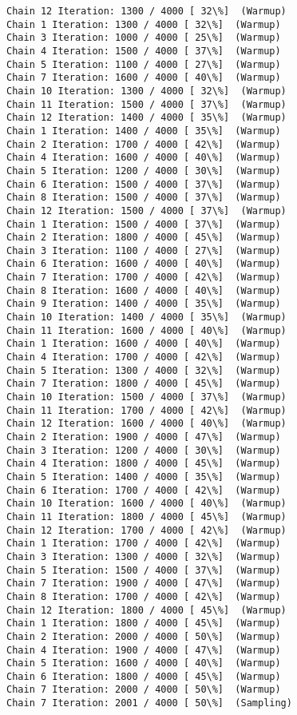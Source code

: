 \documentclass[11pt]{article}
\begin{document}
\begin{Verbatim}[commandchars=\\\{\}]
Chain 12 Iteration: 1300 / 4000 [ 32\%]  (Warmup)
Chain 1 Iteration: 1300 / 4000 [ 32\%]  (Warmup)
Chain 3 Iteration: 1000 / 4000 [ 25\%]  (Warmup)
Chain 4 Iteration: 1500 / 4000 [ 37\%]  (Warmup)
Chain 5 Iteration: 1100 / 4000 [ 27\%]  (Warmup)
Chain 7 Iteration: 1600 / 4000 [ 40\%]  (Warmup)
Chain 10 Iteration: 1300 / 4000 [ 32\%]  (Warmup)
Chain 11 Iteration: 1500 / 4000 [ 37\%]  (Warmup)
Chain 12 Iteration: 1400 / 4000 [ 35\%]  (Warmup)
Chain 1 Iteration: 1400 / 4000 [ 35\%]  (Warmup)
Chain 2 Iteration: 1700 / 4000 [ 42\%]  (Warmup)
Chain 4 Iteration: 1600 / 4000 [ 40\%]  (Warmup)
Chain 5 Iteration: 1200 / 4000 [ 30\%]  (Warmup)
Chain 6 Iteration: 1500 / 4000 [ 37\%]  (Warmup)
Chain 8 Iteration: 1500 / 4000 [ 37\%]  (Warmup)
Chain 12 Iteration: 1500 / 4000 [ 37\%]  (Warmup)
Chain 1 Iteration: 1500 / 4000 [ 37\%]  (Warmup)
Chain 2 Iteration: 1800 / 4000 [ 45\%]  (Warmup)
Chain 3 Iteration: 1100 / 4000 [ 27\%]  (Warmup)
Chain 6 Iteration: 1600 / 4000 [ 40\%]  (Warmup)
Chain 7 Iteration: 1700 / 4000 [ 42\%]  (Warmup)
Chain 8 Iteration: 1600 / 4000 [ 40\%]  (Warmup)
Chain 9 Iteration: 1400 / 4000 [ 35\%]  (Warmup)
Chain 10 Iteration: 1400 / 4000 [ 35\%]  (Warmup)
Chain 11 Iteration: 1600 / 4000 [ 40\%]  (Warmup)
Chain 1 Iteration: 1600 / 4000 [ 40\%]  (Warmup)
Chain 4 Iteration: 1700 / 4000 [ 42\%]  (Warmup)
Chain 5 Iteration: 1300 / 4000 [ 32\%]  (Warmup)
Chain 7 Iteration: 1800 / 4000 [ 45\%]  (Warmup)
Chain 10 Iteration: 1500 / 4000 [ 37\%]  (Warmup)
Chain 11 Iteration: 1700 / 4000 [ 42\%]  (Warmup)
Chain 12 Iteration: 1600 / 4000 [ 40\%]  (Warmup)
Chain 2 Iteration: 1900 / 4000 [ 47\%]  (Warmup)
Chain 3 Iteration: 1200 / 4000 [ 30\%]  (Warmup)
Chain 4 Iteration: 1800 / 4000 [ 45\%]  (Warmup)
Chain 5 Iteration: 1400 / 4000 [ 35\%]  (Warmup)
Chain 6 Iteration: 1700 / 4000 [ 42\%]  (Warmup)
Chain 10 Iteration: 1600 / 4000 [ 40\%]  (Warmup)
Chain 11 Iteration: 1800 / 4000 [ 45\%]  (Warmup)
Chain 12 Iteration: 1700 / 4000 [ 42\%]  (Warmup)
Chain 1 Iteration: 1700 / 4000 [ 42\%]  (Warmup)
Chain 3 Iteration: 1300 / 4000 [ 32\%]  (Warmup)
Chain 5 Iteration: 1500 / 4000 [ 37\%]  (Warmup)
Chain 7 Iteration: 1900 / 4000 [ 47\%]  (Warmup)
Chain 8 Iteration: 1700 / 4000 [ 42\%]  (Warmup)
Chain 12 Iteration: 1800 / 4000 [ 45\%]  (Warmup)
Chain 1 Iteration: 1800 / 4000 [ 45\%]  (Warmup)
Chain 2 Iteration: 2000 / 4000 [ 50\%]  (Warmup)
Chain 4 Iteration: 1900 / 4000 [ 47\%]  (Warmup)
Chain 5 Iteration: 1600 / 4000 [ 40\%]  (Warmup)
Chain 6 Iteration: 1800 / 4000 [ 45\%]  (Warmup)
Chain 7 Iteration: 2000 / 4000 [ 50\%]  (Warmup)
Chain 7 Iteration: 2001 / 4000 [ 50\%]  (Sampling)

\end{Verbatim}
\end{document}

